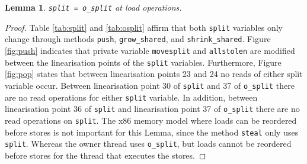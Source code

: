 \documentclass{sig-alternate-br}
\newtheorem{lemma}{Lemma}
\begin{document}
\begin{lemma}
	\texttt{split = o\_split} at load operations.
	\label{lem:split}
\end{lemma}
\begin{proof}
	Table \ref{tab:split} and \ref{tab:osplit} affirm that both \texttt{split} variables only change through methods \texttt{push}, \texttt{grow\_shared}, and \texttt{shrink\_shared}.
	Figure \ref{fig:push} indicates that private variable \texttt{movesplit} and \texttt{allstolen} are modified between the linearisation points of the \texttt{split} variables.
	Furthermore, Figure \ref{fig:pop} states that between linearisation points 23 and 24 no reads of either split variable occur.
	Between linearisation point 30 of \texttt{split} and 37 of \texttt{o\_split} there are no read operations for either \texttt{split} variable.
	In addition, between linearisation point 36 of \texttt{split} and linearisation point 37 of \texttt{o\_split} there are no read operations on \texttt{split}.	
	The x86 memory model where loads can be reordered before stores is not important for this Lemma, since the method \texttt{steal} only uses \texttt{split}.
	Whereas the owner thread uses \texttt{o\_split}, but loads cannot be reordered before stores for the thread that executes the stores.		
\end{proof}
\end{document}

